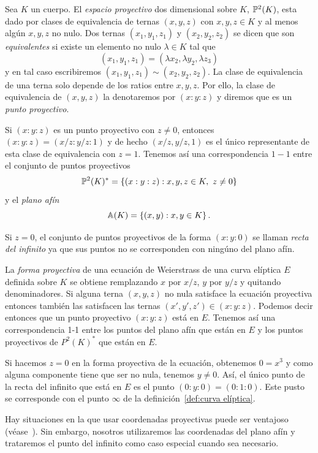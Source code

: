 Sea $K$ un cuerpo. El \emph{espacio proyectivo} dos dimensional sobre $K$, $\P^2(K)$, esta dado por clases de equivalencia de ternas $(x, y, z)$ con $x, y, z \in K$ y al menos algún $x, y, z$ no nulo. Dos ternas $(x_1, y_1, z_1)$ y $(x_2, y_2, z_2)$ se dicen que son \emph{equivalentes} si existe un elemento no nulo $\lambda \in K$ tal que
$$
	(x_1, y_1, z_1) = (\lambda x_2, \lambda y_2, \lambda z_3)
$$
y en tal caso escribiremos $(x_1, y_1, z_1) \sim (x_2, y_2, z_2)$. La clase de equivalencia de una terna solo depende de los ratios entre $x, y, z$. Por ello, la clase de equivalencia de $(x, y, z)$ la denotaremos por $(x : y : z)$ y diremos que es un \emph{punto proyectivo}.

Si $(x : y : z)$ es un punto proyectivo con $z \neq 0$, entonces $(x : y : z) = (x/z : y/z : 1)$ y de hecho $(x/z, y/z, 1)$ es el único representante de esta clase de equivalencia con $z = 1$. Tenemos así una correspondencia $1-1$ entre el conjunto de puntos proyectivos
$$
	\P^2(K)^* = \left\{(x : y : z) : x, y, z \in K,\ z \neq 0 \right\}
$$
y el \emph{plano afín}
$$
	\A(K) = \left\{(x, y) : x, y \in K \right\}.
$$

Si $z = 0$, el conjunto de puntos proyectivos de la forma $(x : y : 0)$ se llaman \emph{recta del infinito} ya que sus puntos no se corresponden con ningúno del plano afín.

La \emph{forma proyectiva} de una ecuación de Weierstrass de una curva elíptica $E$ definida sobre $K$ se obtiene remplazando $x$ por $x/z$, $y$ por $y/z$ y quitando denominadores. Si alguna terna $(x, y, z)$ no nula satisface la ecuación proyectiva entonces también las satisfacen las ternas $(x', y', z') \in (x : y : z)$. Podemos decir entonces que un punto proyectivo $(x : y : z)$ está en $E$. Tenemos así una correspondencia 1-1 entre los puntos del plano afín que están en $E$ y los puntos proyectivos de $P^2(K)^*$ que están en $E$.

Si hacemos $z = 0$ en la forma proyectiva de la ecuación, obtenemos $0 = x^3$ y como alguna componente tiene que ser no nula, tenemos $y \neq 0$. Así, el único punto de la recta del infinito que está en $E$ es el punto $(0 : y : 0) = (0 : 1 : 0)$. Este pusto se corresponde con el punto $\infty$ de la definición~\ref{def:curva elíptica}.

Hay situaciones en la que usar coordenadas proyectivas puede ser ventajoso (véase~\cite[sec 2.6]{Washington:2008}). Sin embargo, nosotros utilizaremos las coordenadas del plano afín y trataremos el punto del infinito como caso especial cuando sea necesario.

